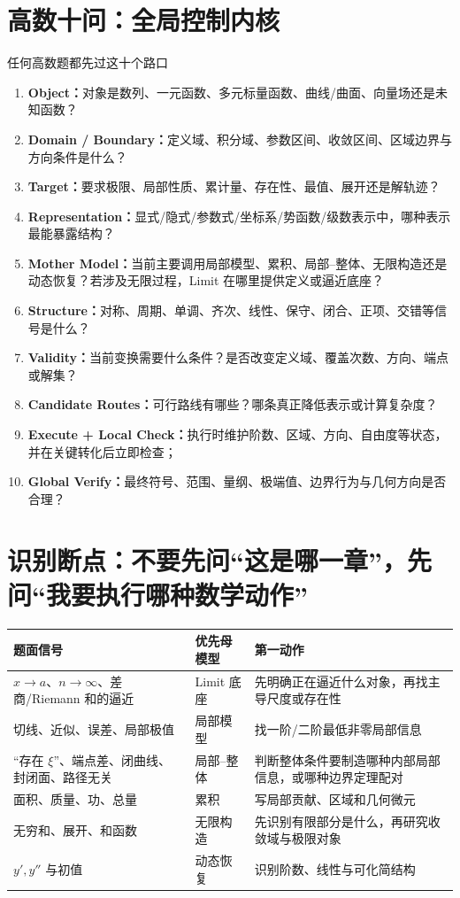 \documentclass[11pt,a4paper,openany]{ctexbook}
\newcommand{\key}[1]{\textbf{\color{deep}#1}}
\begin{document}
\section{高数十问：全局控制内核}
\begin{corebox}{任何高数题都先过这十个路口}
\begin{enumerate}
  \item \key{Object：}对象是数列、一元函数、多元标量函数、曲线/曲面、向量场还是未知函数？
  \item \key{Domain / Boundary：}定义域、积分域、参数区间、收敛区间、区域边界与方向条件是什么？
  \item \key{Target：}要求极限、局部性质、累计量、存在性、最值、展开还是解轨迹？
  \item \key{Representation：}显式/隐式/参数式/坐标系/势函数/级数表示中，哪种表示最能暴露结构？
  \item \key{Mother Model：}当前主要调用局部模型、累积、局部--整体、无限构造还是动态恢复？若涉及无限过程，Limit 在哪里提供定义或逼近底座？
  \item \key{Structure：}对称、周期、单调、齐次、线性、保守、闭合、正项、交错等信号是什么？
  \item \key{Validity：}当前变换需要什么条件？是否改变定义域、覆盖次数、方向、端点或解集？
  \item \key{Candidate Routes：}可行路线有哪些？哪条真正降低表示或计算复杂度？
  \item \key{Execute + Local Check：}执行时维护阶数、区域、方向、自由度等状态，并在关键转化后立即检查；
  \item \key{Global Verify：}最终符号、范围、量纲、极端值、边界行为与几何方向是否合理？
\end{enumerate}
\end{corebox}

\section{识别断点：不要先问“这是哪一章”，先问“我要执行哪种数学动作”}
\begin{longtable}{L{3.0cm}L{5.0cm}L{\dimexpr\linewidth-8.17cm\relax}}
\toprule
\textbf{题面信号} & \textbf{优先母模型} & \textbf{第一动作}\\
\midrule
$x\to a$、$n\to\infty$、差商/Riemann 和的逼近 & Limit 底座 & 先明确正在逼近什么对象，再找主导尺度或存在性\\
切线、近似、误差、局部极值 & 局部模型 & 找一阶/二阶最低非零局部信息\\
“存在 $\xi$”、端点差、闭曲线、封闭面、路径无关 & 局部--整体 & 判断整体条件要制造哪种内部局部信息，或哪种边界定理配对\\
面积、质量、功、总量 & 累积 & 写局部贡献、区域和几何微元\\
无穷和、展开、和函数 & 无限构造 & 先识别有限部分是什么，再研究收敛域与极限对象\\
$y',y''$ 与初值 & 动态恢复 & 识别阶数、线性与可化简结构\\
\bottomrule
\end{longtable}
\end{document}
